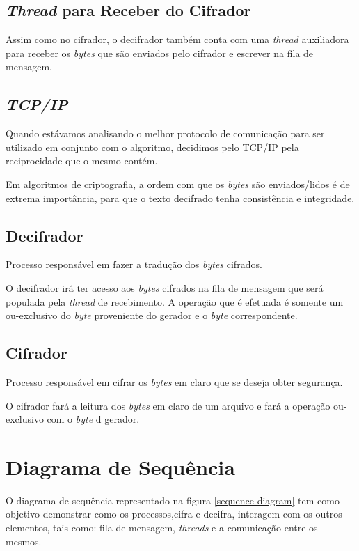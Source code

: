 \subsection{\textit{Thread} para Receber do Cifrador}

Assim como no cifrador, o decifrador também conta com uma \textit{thread} auxiliadora para receber os \textit{bytes} que são enviados pelo cifrador e escrever na fila de mensagem.

\subsection{\textit{TCP/IP}}

Quando estávamos analisando o melhor protocolo de comunicação para ser utilizado em conjunto com o algoritmo, decidimos pelo TCP/IP pela reciprocidade que o mesmo contém. 

Em algoritmos de criptografia, a ordem com que os \textit{bytes} são enviados/lidos é de extrema importância, para que o texto decifrado tenha consistência e integridade. 
\subsection{Decifrador}

Processo responsável em fazer a tradução dos \textit{bytes} cifrados. 

O decifrador irá ter acesso aos \textit{bytes} cifrados na fila de mensagem que será populada pela \textit{thread} de recebimento. A operação que é efetuada é somente um ou-exclusivo do \textit{byte} proveniente do gerador e o \textit{byte} correspondente.

\subsection{Cifrador}

Processo responsável em cifrar os \textit{bytes} em claro que se deseja obter segurança.

O cifrador fará a leitura dos \textit{bytes} em claro de um arquivo e fará a operação ou-exclusivo com o \textit{byte} d gerador.

\section{Diagrama de Sequência}

O diagrama de sequência representado na figura \ref{sequence-diagram} tem como objetivo demonstrar como os processos,cifra e  decifra, interagem com os outros elementos, tais como: fila de mensagem, \textit{threads} e a comunicação entre os mesmos. 


